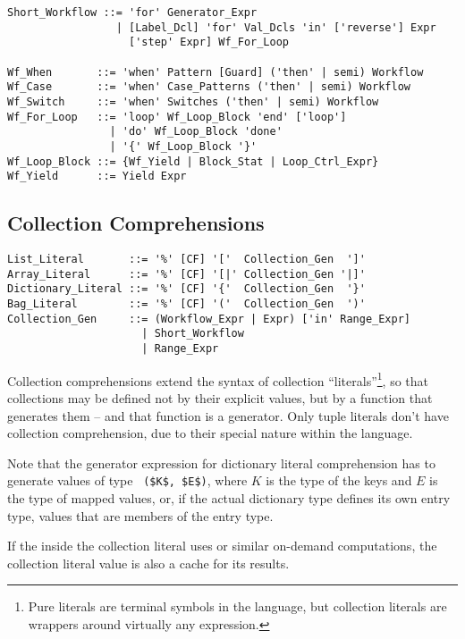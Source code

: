 \begin{lstlisting}
Short_Workflow ::= 'for' Generator_Expr
                 | [Label_Dcl] 'for' Val_Dcls 'in' ['reverse'] Expr 
                   ['step' Expr] Wf_For_Loop
           
Wf_When       ::= 'when' Pattern [Guard] ('then' | semi) Workflow
Wf_Case       ::= 'when' Case_Patterns ('then' | semi) Workflow
Wf_Switch     ::= 'when' Switches ('then' | semi) Workflow
Wf_For_Loop   ::= 'loop' Wf_Loop_Block 'end' ['loop']
                | 'do' Wf_Loop_Block 'done'
                | '{' Wf_Loop_Block '}'
Wf_Loop_Block ::= {Wf_Yield | Block_Stat | Loop_Ctrl_Expr}
Wf_Yield      ::= Yield Expr
\end{lstlisting}





\subsection{Collection Comprehensions}
\label{sec:collection-comprehensions}

\syntax\begin{lstlisting}
List_Literal       ::= '%' [CF] '['  Collection_Gen  ']'
Array_Literal      ::= '%' [CF] '[|' Collection_Gen '|]'
Dictionary_Literal ::= '%' [CF] '{'  Collection_Gen  '}'
Bag_Literal        ::= '%' [CF] '('  Collection_Gen  ')'
Collection_Gen     ::= (Workflow_Expr | Expr) ['in' Range_Expr]
                     | Short_Workflow
                     | Range_Expr
\end{lstlisting}

Collection comprehensions extend the syntax of collection ``literals''\footnote{Pure literals are terminal symbols in the language, but collection literals are wrappers around virtually any expression.}, so that collections may be defined not by their explicit values, but by a function that generates them -- and that function is a generator. Only tuple literals don't have collection comprehension, due to their special nature within the language. 

Note that the generator expression for dictionary literal comprehension has to generate values of type ~\lstinline!($K$, $E$)!, where $K$ is the type of the keys and $E$ is the type of mapped values, or, if the actual dictionary type defines its own entry type, values that are members of the entry type. 

If the  inside the collection literal uses  or similar on-demand computations, the collection literal value is also a cache for its results. 

